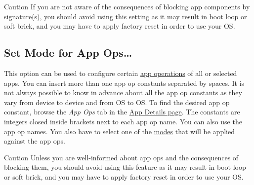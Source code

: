 \begin{danger}{Caution}
    If you are not aware of the consequences of blocking app components by signature(s), you should avoid using this
    setting as it may result in boot loop or soft brick, and you may have to apply factory reset in order to use your OS\@.
\end{danger}

\subsection{Set Mode for App Ops\dots}\label{subsec:set-mode-for-app-ops-dots}
This option can be used to configure certain \hyperref[ch:app-ops]{app operations} of all or selected apps. You can
insert more than one app op constants separated by spaces. It is not always possible to know in advance about all the
app op constants as they vary from device to device and from OS to OS. To find the desired app op constant, browse the
\textit{App Ops} tab in the \hyperref[sec:app-details-page]{App Details page}. The constants are integers closed inside
brackets next to each app op name. You can also use the app op names. You also have to select one of the
\hyperref[subsec:mode-constants]{modes} that will be applied against the app ops.

\begin{danger}{Caution}
    Unless you are well-informed about app ops and the consequences of blocking them, you should avoid using this
    feature as it may result in boot loop or soft brick, and you may have to apply factory reset in order to use your OS\@.
\end{danger}
